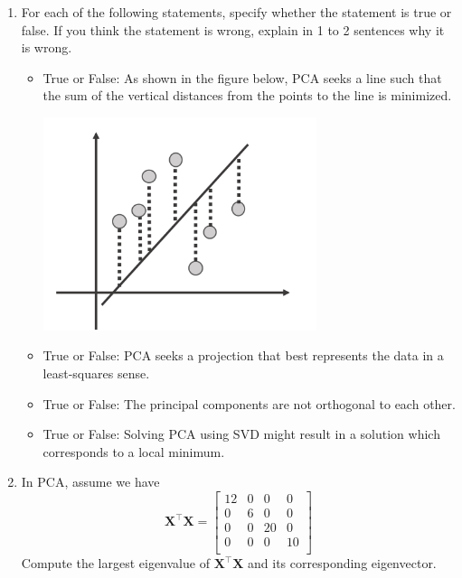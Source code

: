 \begin{Q}
\begin{enumerate}
\fi

\item For each of the following statements, specify whether the statement is true or false. If you think the statement is wrong, explain in 1 to 2 sentences why it is wrong.


\begin{itemize}
\item True or False: As shown in the figure below, PCA seeks a line such that the sum of the vertical distances from the points to the line is minimized.
\begin{center}
 \includegraphics[width=8cm]{figs/pca.pdf}
 \end{center}

\item True or False: PCA seeks a projection that best represents the data in a least-squares sense.

\item True or False: The principal components are not orthogonal to each other.

\item True or False: Solving PCA using SVD might result in a solution which corresponds to a local minimum.
\end{itemize}

\item In PCA, assume we have \[ \bm X^\top \bm X= \left[ \begin{array}{cccc}
	12 & 0 & 0 & 0\\
	0 & 6 & 0 & 0\\
	0 & 0 & 20 & 0\\
	0 & 0 & 0 & 10\\
	\end{array} \right]\] 
Compute the largest eigenvalue of $\bm X^\top \bm X$ and its corresponding eigenvector.

\end{enumerate}
\end{Q}